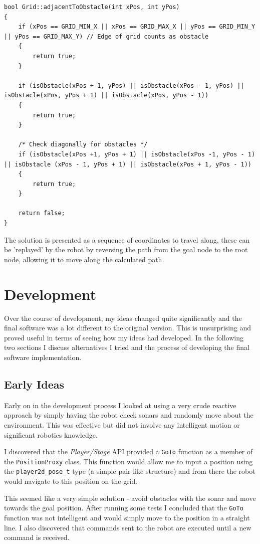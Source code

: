 \documentclass[a4paper,12pt]{article}
\begin{document}
\begin{lstlisting}
bool Grid::adjacentToObstacle(int xPos, int yPos)
{
    if (xPos == GRID_MIN_X || xPos == GRID_MAX_X || yPos == GRID_MIN_Y || yPos == GRID_MAX_Y) // Edge of grid counts as obstacle
    {
        return true;
    }

    if (isObstacle(xPos + 1, yPos) || isObstacle(xPos - 1, yPos) || isObstacle(xPos, yPos + 1) || isObstacle(xPos, yPos - 1))
    {
        return true;
    }

    /* Check diagonally for obstacles */
    if (isObstacle(xPos +1, yPos + 1) || isObstacle(xPos -1, yPos - 1) || isObstacle (xPos - 1, yPos + 1) || isObstacle(xPos + 1, yPos - 1))
    {
        return true;
    }

    return false;
}
\end{lstlisting}

The solution is presented as a sequence of coordinates to travel along, these can be 'replayed' by the robot by reversing the path from the goal node to the root node, allowing it to move along the calculated path.
\section{Development}
Over the course of development, my ideas changed quite significantly and the final software was a lot different to the original version. This is unsurprising and proved useful in terms of seeing how my ideas had developed. In the following two sections I discuss alternatives I tried and the process of developing the final software implementation.
\subsection{Early Ideas}
Early on in the development process I looked at using a very crude reactive approach by simply having the robot check sonars and randomly move about the environment. This was effective but did not involve any intelligent motion or significant robotics knowledge. 

I discovered that the \textit{Player/Stage} API provided a \texttt{GoTo} function as a member of the \texttt{PositionProxy} class. This function would allow me to input a position using the \texttt{player2d\_pose\_t} type (a simple pair like structure) and from there the robot would navigate to this position on the grid.

This seemed like a very simple solution - avoid obstacles with the sonar and move towards the goal position. After running some tests I concluded that the \texttt{GoTo} function was not intelligent and would simply move to the position in a straight line. I also discovered that commands sent to the robot are executed until a new command is received.
\end{document}
